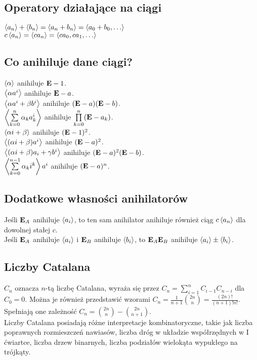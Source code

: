 \subsection*{Operatory działające na ciągi}
$\left\langle a_n \right\rangle + \left\langle b_n \right\rangle = \left\langle a_n + b_n \right\rangle = \left\langle a_0 + b_0, 
\ldots \right\rangle$ \\
$c \left\langle a_n \right\rangle = \left\langle c a_n \right\rangle = \left\langle ca_0, ca_1, \ldots \right\rangle$

\subsection*{Co anihiluje dane ciągi?}
$\left\langle \alpha \right\rangle$ anihiluje $\mathbf{E} - 1$. \\
$\left\langle \alpha a^i \right\rangle$ anihiluje $\mathbf{E} - a$. \\
$\left\langle \alpha a^i + \beta b^i \right\rangle$ anihiluje $(\mathbf{E} - a)(\mathbf{E} - b)$. \\
$\left\langle \sum\limits_{k=0}^{n} \alpha_k a_k^i \right\rangle$ anihiluje 
$\prod\limits_{k=0}^{n} (\mathbf{E} - a_k)$. \\
$\left\langle \alpha i + \beta \right\rangle$ anihiluje $(\mathbf{E} - 1)^2$. \\
$\left\langle (\alpha i + \beta) a^i \right\rangle$ anihiluje $(\mathbf{E} - a)^2$. \\
$\left\langle (\alpha i + \beta) a_i + \gamma b^i \right\rangle$ anihiluje
$(\mathbf{E} - a)^2 (\mathbf{E} - b)$. \\
$\left\langle \sum\limits_{k=0}^{n-1} \alpha_k i^k \right\rangle a^i$ anihiluje 
$(\mathbf{E} - a)^n$. \\

\subsection*{Dodatkowe własności anihilatorów}
Jeśli $\mathbf{E}_A$ anihiluje $\left\langle a_i \right\rangle$, to ten sam anihilator anihiluje
również ciąg $c \left\langle a_n \right\rangle$ dla dowolnej stałej $c$. \\
Jeśli $\mathbf{E}_A$ anihiluje $\left\langle a_i \right\rangle$ i $\mathbf{E}_B$ anihiluje
$\left\langle b_i \right\rangle$, to $\mathbf{E}_A \mathbf{E}_B$ anihiluje
$\left\langle a_i \right\rangle \pm \left\langle b_i \right\rangle$.

\subsection*{Liczby Catalana}
$C_n$ oznacza $n$-tą liczbę Catalana, wyraża się przez 
$C_n = \sum\limits_{i=1}^{n} C_{i-1} C_{n-i}$ dla $C_0 = 0$. Można je również
przedstawić wzorami $C_n = \frac{1}{n+1} \binom{2n}{n} = \frac{(2n)!}{(n+1)!n!}$.
Spełniają one zależność $C_n = \binom{2n}{n} - \binom{2n}{n+1}$. \\
Liczby Catalana posiadają różne interpretacje kombinatoryczne, takie jak
liczba poprawnych rozmieszczeń nawiasów, liczba dróg w układzie współrzędnych
w I ćwiartce, liczba drzew binarnych, liczba podziałów wielokąta wypukłego na trójkąty.

